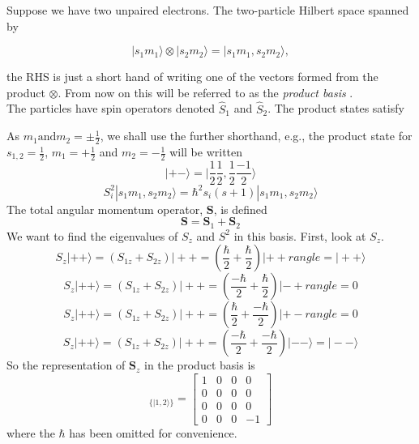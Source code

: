 \documentclass[12pt]{article}
\begin{document}
\noindent Suppose we have two unpaired electrons. The two-particle Hilbert
space spanned by

\begin{equation} |s_{1}m_{1}\rangle \otimes | s_{2}m_{2} \rangle = |
s_{1}m_{1}, s_{2}m_{2} \rangle,
\end{equation}

\noindent the RHS is just a short hand of writing one of the vectors formed
from the product $\otimes$. From now on this will be referred to as the
\emph{product basis} . \\

\noindent The particles have spin operators denoted $\hat{S}_{1}$ and
$\hat{S}_{2}$. The product states satisfy

\noindent As $m_{1}  \text{and} m_{2} = \pm \frac{1}{2} $, we shall use the
further shorthand, e.g., the product state for $s_{1,2} = \frac{1}{2}$, $m_{1}
= +\frac{1}{2}$ and $m_{2} = -\frac{1}{2} $ will be written
\begin{equation}
|+-\rangle = | \frac{1}{2}\frac{1}{2},\frac{1}{2}\frac{-1}{2} \rangle
\end{equation}
\begin{equation}
S^{2}_{i}|s_{1}m_{1}, s_{2}m_{2} \rangle = \hbar^{2}s_{i}(s+1)|s_{1}m_{1}, s_{2}m_{2} \rangle
\end{equation}
\noindent The total angular momentum operator, $\mathbf{S}$, is defined 
\begin{equation}
\mathbf{S} = \mathbf{S}_{1}+\mathbf{S}_{2}
\end{equation}
We want to find the eigenvalues of $S_{z}$ and $S^{2}$ in this basis. First, look at
$S_{z}$.
\begin{equation}
S_{z}|++\rangle =
(S_{1z}+S_{2z})|++ = (\frac{\hbar}{2} + \frac{\hbar}{2}) | ++ rangle = |++\rangle
\end{equation}
\begin{equation}
S_{z}|++\rangle =
(S_{1z}+S_{2z})|++ = (\frac{-\hbar}{2} + \frac{\hbar}{2}) | -+ rangle = 0
\end{equation}
\begin{equation}
S_{z}|++\rangle =
(S_{1z}+S_{2z})|++ = (\frac{\hbar}{2} + \frac{-\hbar}{2}) | +- rangle = 0
\end{equation}
\begin{equation}
S_{z}|++\rangle = 
(S_{1z}+S_{2z})|++ = (\frac{-\hbar}{2} + \frac{-\hbar}{2}) | -- \rangle = | -- \rangle
\end{equation}
So the representation of $\mathbf{S}_{z}$ in the product basis is
\begin{equation}
[S_{z}]_{\{|1,2\rangle\}} = 
\begin{bmatrix}
1                  & 0 & 0 & 0 \\
0                  & 0 & 0 & 0 \\
0                  & 0 & 0 & 0 \\
0                  & 0 & 0 & -1 
\end{bmatrix}
\end{equation}
where the $\hbar$ has been omitted for convenience.\\
\end{document}
